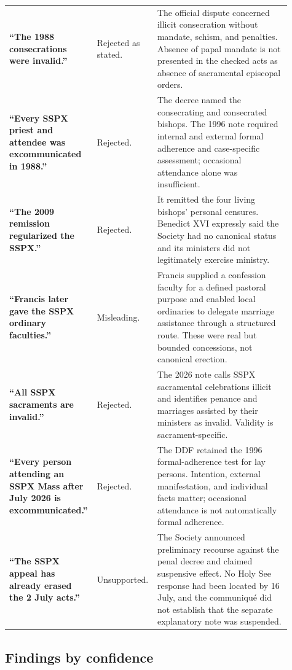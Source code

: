 \begin{longtable}{>{\bfseries\RaggedRight\arraybackslash}p{0.25\linewidth}>{\RaggedRight\arraybackslash}p{0.19\linewidth}>{\RaggedRight\arraybackslash}p{0.47\linewidth}}
“The 1988 consecrations were invalid.” & Rejected as stated. & The official dispute concerned illicit consecration without mandate, schism, and penalties. Absence of papal mandate is not presented in the checked acts as absence of sacramental episcopal orders.\\
“Every SSPX priest and attendee was excommunicated in 1988.” & Rejected. & The decree named the consecrating and consecrated bishops. The 1996 note required internal and external formal adherence and case-specific assessment; occasional attendance alone was insufficient.\\
“The 2009 remission regularized the SSPX.” & Rejected. & It remitted the four living bishops' personal censures. Benedict XVI expressly said the Society had no canonical status and its ministers did not legitimately exercise ministry.\\
“Francis later gave the SSPX ordinary faculties.” & Misleading. & Francis supplied a confession faculty for a defined pastoral purpose and enabled local ordinaries to delegate marriage assistance through a structured route. These were real but bounded concessions, not canonical erection.\\
“All SSPX sacraments are invalid.” & Rejected. & The 2026 note calls SSPX sacramental celebrations illicit and identifies penance and marriages assisted by their ministers as invalid. Validity is sacrament-specific.\\
“Every person attending an SSPX Mass after July 2026 is excommunicated.” & Rejected. & The DDF retained the 1996 formal-adherence test for lay persons. Intention, external manifestation, and individual facts matter; occasional attendance is not automatically formal adherence.\\
“The SSPX appeal has already erased the 2 July acts.” & Unsupported. & The Society announced preliminary recourse against the penal decree and claimed suspensive effect. No Holy See response had been located by 16 July, and the communiqué did not establish that the separate explanatory note was suspended.\\
\end{longtable}

\subsection{Findings by confidence}

